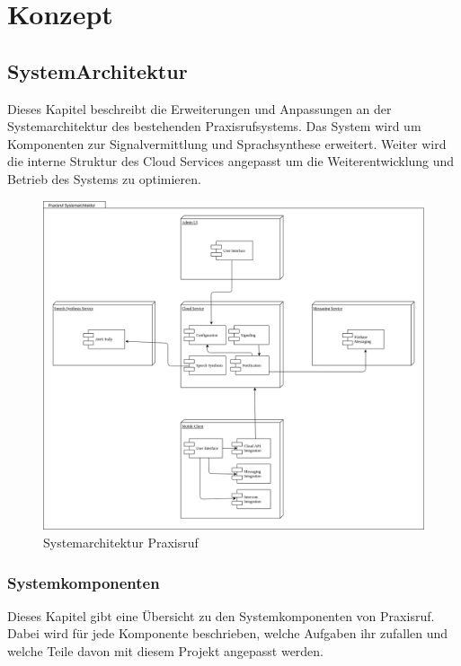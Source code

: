 \section{Konzept}

\subsection{SystemArchitektur}

Dieses Kapitel beschreibt die Erweiterungen und Anpassungen an der Systemarchitektur des bestehenden Praxisrufsystems.
Das System wird um Komponenten zur Signalvermittlung und Sprachsynthese erweitert.
Weiter wird die interne Struktur des Cloud Services angepasst um die Weiterentwicklung und Betrieb des Systems zu optimieren.

\begin{figure}[h]
    \centering
    \begin{minipage}[b]{0.75\textwidth}
        \includegraphics[width=\textwidth]{graphics/diagramms/Component_System_V02}
        \caption{Systemarchitektur Praxisruf}
    \end{minipage}
\end{figure}

\subsubsection{Systemkomponenten}

Dieses Kapitel gibt eine Übersicht zu den Systemkomponenten von Praxisruf.
Dabei wird für jede Komponente beschrieben, welche Aufgaben ihr zufallen und welche Teile davon mit diesem Projekt angepasst werden.

